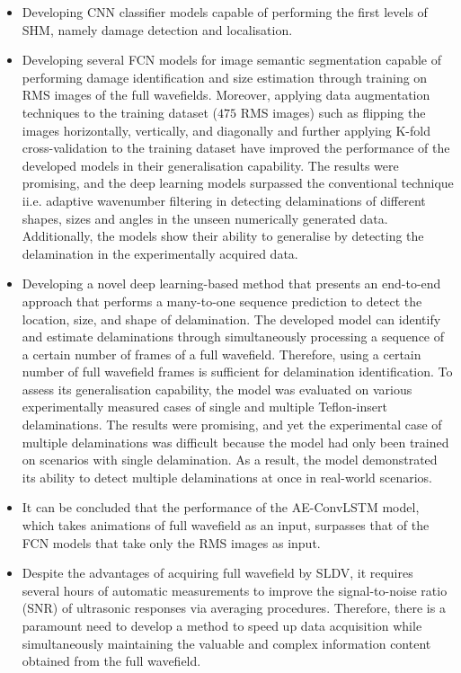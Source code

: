 \begin{itemize}
	\item Developing CNN classifier models capable of performing the first levels of SHM, namely damage detection and localisation.
	\item Developing several FCN models for image semantic segmentation capable of performing damage identification and size estimation through training on RMS images of the full wavefields.
	Moreover, applying data augmentation techniques to the training dataset (\(475\) RMS images) such as flipping the images horizontally, vertically, and diagonally and further applying K-fold cross-validation to the training dataset have improved the performance of the developed models in their generalisation capability.
	The results were promising, and the deep learning models surpassed the conventional technique ii.e. adaptive wavenumber filtering in detecting delaminations of different shapes, sizes and angles in the unseen numerically generated data. 
	Additionally, the models show their ability to generali\-se by detecting the delamination in the experimentally acquired data.
	\item Developing a novel deep learning-based method that presents an end-to-end approach that performs a many-to-one sequence prediction to detect the location, size, and shape of delamination.
	The developed model can identify and estimate delaminations through simultaneously processing a sequence of a certain number of frames of a full wavefield.
	Therefore, using a certain number of full wavefield frames is sufficient for delamination identification.
	To assess its generalisation capability, the model was evaluated on various experimentally measured cases of single and multiple Teflon-insert delaminations.
	The results were promising, and yet the experimental case of multiple delamina\-tions was difficult because the model had only been trained on scenarios with single delamination.
	As a result, the model demonstrated its ability to detect multiple delaminations at once in real-world scenarios.
	\item It can be concluded that the performance of the AE-ConvLSTM model, which takes animations of full wavefield as an input, surpasses that of the FCN models that take only the RMS images as input.
	\item Despite the advantages of acquiring full wavefield by SLDV, it requires several hours of automatic measurements to improve the signal-to-noise ratio (SNR) of ultrasonic responses via averaging procedures.
	Therefore, there is a paramount need to develop a method to speed up data acquisition while simulta\-neously maintaining the valuable and complex information content obtained from the full wavefield.

\end{itemize}
